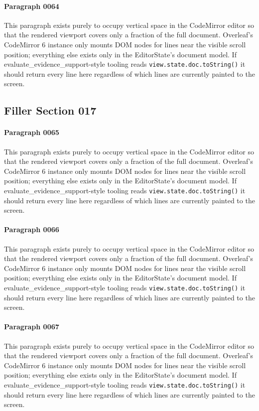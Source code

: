 \documentclass{article}
\begin{document}
\paragraph{Paragraph 0064}
This paragraph exists purely to occupy vertical space in the CodeMirror editor so that the rendered viewport covers only a fraction of the full document. Overleaf's CodeMirror 6 instance only mounts DOM nodes for lines near the visible scroll position; everything else exists only in the EditorState's document model. If evaluate\_evidence\_support-style tooling reads \texttt{view.state.doc.toString()} it should return every line here regardless of which lines are currently painted to the screen.

\subsection{Filler Section 017}
\paragraph{Paragraph 0065}
This paragraph exists purely to occupy vertical space in the CodeMirror editor so that the rendered viewport covers only a fraction of the full document. Overleaf's CodeMirror 6 instance only mounts DOM nodes for lines near the visible scroll position; everything else exists only in the EditorState's document model. If evaluate\_evidence\_support-style tooling reads \texttt{view.state.doc.toString()} it should return every line here regardless of which lines are currently painted to the screen.

\paragraph{Paragraph 0066}
This paragraph exists purely to occupy vertical space in the CodeMirror editor so that the rendered viewport covers only a fraction of the full document. Overleaf's CodeMirror 6 instance only mounts DOM nodes for lines near the visible scroll position; everything else exists only in the EditorState's document model. If evaluate\_evidence\_support-style tooling reads \texttt{view.state.doc.toString()} it should return every line here regardless of which lines are currently painted to the screen.

\paragraph{Paragraph 0067}
This paragraph exists purely to occupy vertical space in the CodeMirror editor so that the rendered viewport covers only a fraction of the full document. Overleaf's CodeMirror 6 instance only mounts DOM nodes for lines near the visible scroll position; everything else exists only in the EditorState's document model. If evaluate\_evidence\_support-style tooling reads \texttt{view.state.doc.toString()} it should return every line here regardless of which lines are currently painted to the screen.
\end{document}
